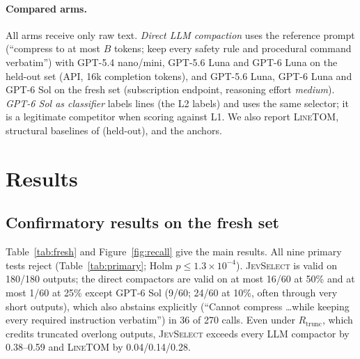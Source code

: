 \documentclass[11pt,a4paper]{article}
\newcommand{\sel}{\textsc{JevSelect}}
\newcommand{\linetom}{\textsc{LineTOM}}
\newcommand{\Rt}{R_{\mathrm{trunc}}}
\begin{document}
\paragraph{Compared arms.} All arms receive only raw text. \emph{Direct LLM compaction} uses the reference prompt (``compress to at most $B$ tokens; keep every safety rule and procedural command verbatim'') with GPT-5.4 nano/mini, GPT-5.6 Luna and GPT-6 Luna on the held-out set (API, 16k completion tokens), and GPT-5.6 Luna, GPT-6 Luna and GPT-6 Sol \citep{openai2026gpt56} on the fresh set (subscription endpoint, reasoning effort \emph{medium}). \emph{GPT-6 Sol as classifier} labels lines (the L2 labels) and uses the same selector; it is a legitimate competitor when scoring against L1. We also report \linetom{}, structural baselines of \citet{zerhoudi2026cliff} (held-out), and the anchors.

\section{Results}
\subsection{Confirmatory results on the fresh set}\label{sec:confirm}
Table~\ref{tab:fresh} and Figure~\ref{fig:recall} give the main results. All nine primary tests reject (Table~\ref{tab:primary}; Holm $p\le1.3\times10^{-4}$). \sel{} is valid on 180/180 outputs; the direct compactors are valid on at most 16/60 at 50\% and at most 1/60 at 25\% except GPT-6 Sol (9/60; 24/60 at 10\%, often through very short outputs), which also abstains explicitly (``Cannot compress \ldots while keeping every required instruction verbatim'') in 36 of 270 calls. Even under $\Rt$, which credits truncated overlong outputs, \sel{} exceeds every LLM compactor by 0.38--0.59 and \linetom{} by 0.04/0.14/0.28.
\end{document}
